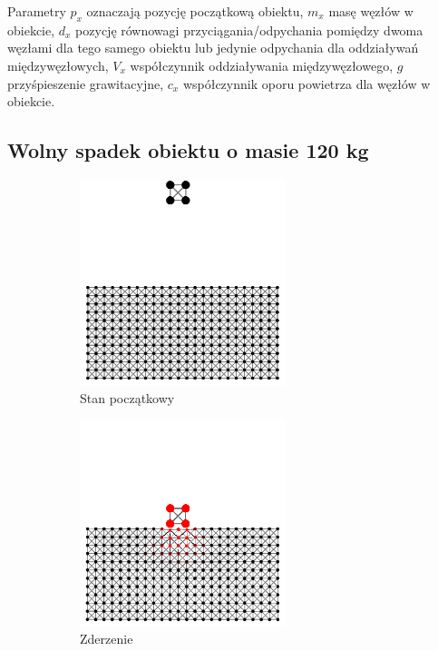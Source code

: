 \documentclass[12pt, letterpaper]{report}
\begin{document}
    Parametry $p_x$ oznaczają pozycję początkową obiektu, $m_x$ masę węzłów w obiekcie, 
    $d_x$ pozycję równowagi przyciągania/odpychania pomiędzy dwoma węzłami dla tego
    samego obiektu lub jedynie odpychania dla oddziaływań międzywęzłowych,
    $V_x$ współczynnik oddziaływania międzywęzłowego, $g$ przyśpieszenie grawitacyjne, 
    $c_x$ współczynnik oporu powietrza dla węzłów w obiekcie.

    \subsection{Wolny spadek obiektu o masie 120 kg}
    \begin{figure}[h]

        \begin{subfigure}{0.5\textwidth}
            \centering
            \includegraphics[width=6cm, height=6cm]{collision_2x2_24x12_mass30_1} 
            \caption{Stan początkowy}
        \end{subfigure}
        \begin{subfigure}{0.5\textwidth}
            \centering
            \includegraphics[width=6cm, height=6cm]{collision_2x2_24x12_mass30_2}
            \caption{Zderzenie}
        \end{subfigure}
        \begin{subfigure}{0.5\textwidth}
            \centering

\end{subfigure}
\end{figure}
\end{document}
